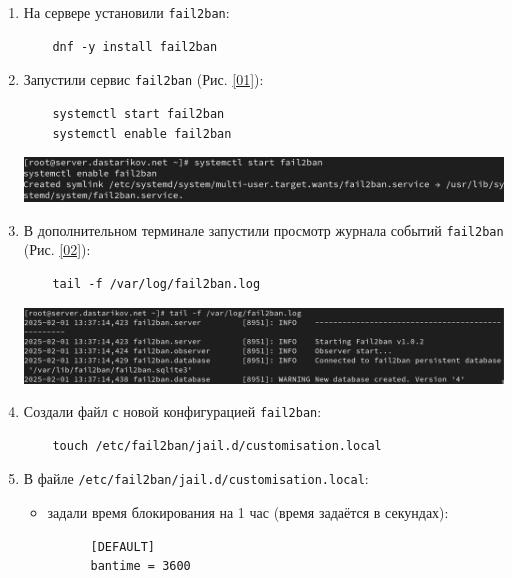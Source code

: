 \begin{enumerate}
\item На сервере установили {\tt fail2ban}:
\begin{verbatim}
    dnf -y install fail2ban
\end{verbatim}

\item Запустили сервис {\tt fail2ban} (Рис. \ref{01}):
\begin{verbatim}
    systemctl start fail2ban
    systemctl enable fail2ban
\end{verbatim}

  \begin{center}
    \centering
    \includegraphics[width=\textwidth]{../images/image01.png}
    \label{01}
  \end{center}

\item В дополнительном терминале запустили просмотр журнала событий {\tt fail2ban} (Рис. \ref{02}):
\begin{verbatim}
    tail -f /var/log/fail2ban.log
\end{verbatim}

  \begin{center}
    \centering
    \includegraphics[width=\textwidth]{../images/image02.png}
    \label{02}
  \end{center}

\item Создали файл с новой конфигурацией {\tt fail2ban}:
\begin{verbatim}
    touch /etc/fail2ban/jail.d/customisation.local
\end{verbatim}

\item В файле {\tt /etc/fail2ban/jail.d/customisation.local}:
  \begin{itemize}
  \item задали время блокирования на 1 час (время задаётся в секундах):
\begin{verbatim}
      [DEFAULT]
      bantime = 3600
\end{verbatim}


\end{itemize}
\end{enumerate}
